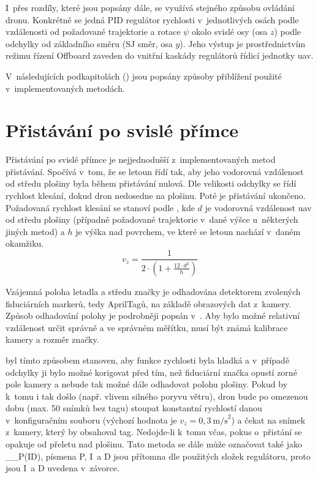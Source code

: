     I~přes rozdíly, které jsou popsány dále, se využívá stejného způsobu ovládání dronu. Konkrétně se jedná PID regulátor rychlosti v~jednotlivých osách podle vzdálenosti od požadované trajektorie a rotace $\psi$ okolo svislé osy (osa $z$) podle odchylky od základního směru (SJ směr, osa $y$). Jeho výstup je prostřednictvím režimu řízení Offboard zaveden do vnitřní kaskády regulátorů řídicí jednotky \acrshort{uav}.
    
    V~následujících podkapitolách () jsou popsány způsoby přiblížení použité v~implementovaných metodách.

    \section{Přistávání po svislé přímce} \label{sec:offboardpid}
        Přistávání po svislé přímce je nejjednodušší z~implementovaných metod přistávání. Spočívá v~tom, že se letoun řídí tak, aby jeho vodorovná vzdálenost od středu plošiny byla během přistávání nulová. Dle velikosti odchylky se řídí rychlost klesání, dokud dron nedosedne na plošinu. Poté je přistávání ukončeno. Požadovaná rychlost klesání se stanoví podle , kde $d$ je vodorovná vzdálenost \acrshort{uav} od středu plošiny (případně požadované trajektorie v~dané výšce u~některých jiných metod) a $h$ je výška nad povrchem, ve které se letoun nachází v~daném okamžiku.
        \begin{equation} \label{eq:vz}
            v_z = \frac{1}{2\cdot\left(1+\frac{12\cdot d^2}{h}\right)}
        \end{equation}

        Vzájemná poloha letadla a středu značky je odhadována detektorem zvolených fiduciárních markerů, tedy AprilTagů, na základě obrazových dat z~kamery. Způsob odhadování polohy je podrobněji popsán v~. Aby bylo možné relativní vzdálenost určit správně a ve správném měřítku, musí být známá kalibrace kamery a rozměr značky.

         byl tímto způsobem stanoven, aby funkce rychlosti byla hladká a v~případě odchylky ji bylo možné korigovat před tím, než fiduciární značka opustí zorné pole kamery a nebude tak možné dále odhadovat polohu plošiny. Pokud by k~tomu i tak došlo (např. vlivem silného poryvu větru), dron bude po omezenou dobu (max. 50 snímků bez tagu) stoupat konstantní rychlostí danou v~konfiguračním souboru (výchozí hodnota je $v_z=0{,}3~\mathrm{m/s}^2$) a čekat na snímek z~kamery, který by obsahoval tag. Nedojde-li k~tomu včas, pokus o~přistání se opakuje od přeletu nad plošinu. Tato metoda se dále může označovat také jako \_\_P(ID), písmena P, I~a D jsou přítomna dle použitých složek regulátoru, proto jsou I~a D uvedena v~závorce.
        
